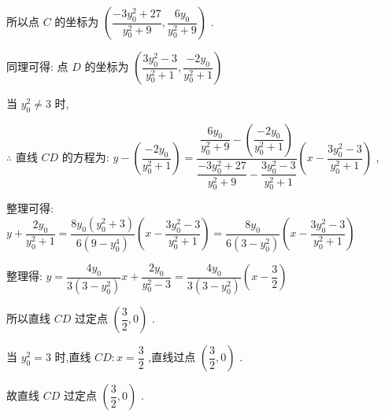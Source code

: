 \begin{enumerate}
\begin{jieda}
\begin{enumerate}
            所以点 $C$ 的坐标为 $\left( {\dfrac{-3{y}_{0}^{2} + {27}}{{y}_{0}^{2} + 9},\dfrac{6{y}_{0}}{{y}_{0}^{2} + 9}}\right)$ .
            
            同理可得: 点 $D$ 的坐标为 $\left( {\dfrac{3{y}_{0}^{2} - 3}{{y}_{0}^{2} + 1},\dfrac{-2{y}_{0}}{{y}_{0}^{2} + 1}}\right)$
            
            当 ${y}_{0}^{2} \neq  3$ 时,
            
            $\therefore$ 直线 ${CD}$ 的方程为: $y - \left( \dfrac{-2{y}_{0}}{{y}_{0}^{2} + 1}\right)  = \dfrac{\dfrac{6{y}_{0}}{{y}_{0}^{2} + 9} - \left( \dfrac{-2{y}_{0}}{{y}_{0}^{2} + 1}\right) }{\dfrac{-3{y}_{0}^{2} + {27}}{{y}_{0}^{2} + 9} - \dfrac{3{y}_{0}^{2} - 3}{{y}_{0}^{2} + 1}}\left( {x - \dfrac{3{y}_{0}^{2} - 3}{{y}_{0}^{2} + 1}}\right)$ ,
            
            整理可得: $y + \dfrac{2{y}_{0}}{{y}_{0}^{2} + 1} = \dfrac{8{y}_{0}\left( {{y}_{0}^{2} + 3}\right) }{6\left( {9 - {y}_{0}^{4}}\right) }\left( {x - \dfrac{3{y}_{0}^{2} - 3}{{y}_{0}^{2} + 1}}\right)  = \dfrac{8{y}_{0}}{6\left( {3 - {y}_{0}^{2}}\right) }\left( {x - \dfrac{3{y}_{0}^{2} - 3}{{y}_{0}^{2} + 1}}\right)$
            
            整理得: $y = \dfrac{4{y}_{0}}{3\left( {3 - {y}_{0}^{2}}\right) }x + \dfrac{2{y}_{0}}{{y}_{0}^{2} - 3} = \dfrac{4{y}_{0}}{3\left( {3 - {y}_{0}^{2}}\right) }\left( {x - \dfrac{3}{2}}\right)$
            
            所以直线 ${CD}$ 过定点 $\left( {\dfrac{3}{2},0}\right)$ .
            
            当 ${y}_{0}^{2} = 3$ 时,直线 ${CD} : x = \dfrac{3}{2}$ ,直线过点 $\left( {\dfrac{3}{2},0}\right)$ .
            
            故直线 ${CD}$ 过定点 $\left( {\dfrac{3}{2},0}\right)$ .
        \end{enumerate}   
        \end{jieda}
    

\end{enumerate}

